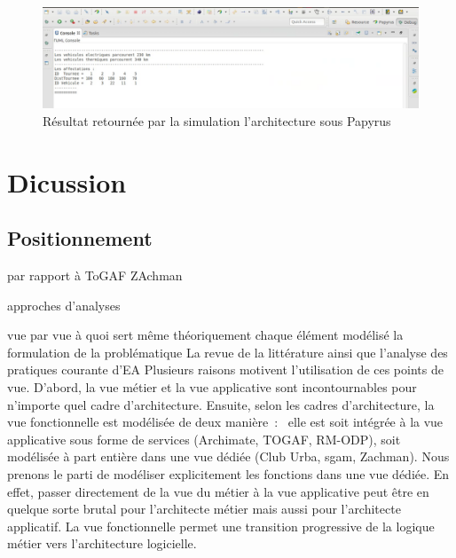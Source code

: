 \begin{figure}[!htbp]
 \begin{center}
  \includegraphics[width=1\textwidth]{figures/5_implementation/resultat_simu.png}
 \end{center}
 \caption{Résultat retournée par la simulation l'architecture sous Papyrus}
 \label{fig:resultat_simu}
\end{figure} 


 


\section{Dicussion}

    \subsection{Positionnement}
par rapport à ToGAF
ZAchman

approches d'analyses

vue par vue à quoi sert même théoriquement
chaque élément modélisé la formulation de la problématique
La revue de la littérature ainsi que
l'analyse des pratiques courante d'EA Plusieurs raisons
motivent l'utilisation de ces points de vue. D'abord, la vue métier et la vue
applicative sont incontournables pour n'importe quel cadre d'architecture.
Ensuite, selon les cadres d'architecture, la vue fonctionnelle est modélisée de
deux manière~:~ elle est soit intégrée à la vue applicative sous forme de
services (Archimate, TOGAF, RM-ODP), soit modélisée à part entière dans une vue
dédiée (Club Urba, \gls{sgam}, Zachman). Nous prenons le parti de modéliser
explicitement les fonctions dans une vue dédiée. En effet, passer directement
de la vue du métier à la vue applicative peut être en quelque sorte brutal pour
l'architecte métier mais aussi pour l'architecte applicatif. La vue fonctionnelle
permet une transition progressive de la logique métier vers l'architecture
logicielle.

